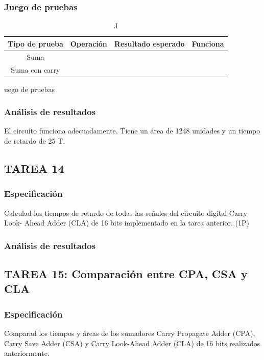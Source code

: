 \documentclass{article}
\begin{document}
		\subsubsection*{Juego de pruebas}
		\begin{table}[h]
			\begin{center}
				\begin{tabular}{| c | c | c | c |}
					\hline
					Tipo de prueba & Operación & Resultado esperado & Funciona \\ \hline
					
					Suma & & & \\ \hline
					Suma con carry & & & \\ \hline
				\end{tabular}
				\caption Juego de pruebas
			\end{center}
		\end{table}



		\subsubsection*{Análisis de resultados}
				El circuito funciona adecuadamente. Tiene un área de 1248 unidades y un tiempo de retardo de 25 T.


	\subsection{TAREA 14}
		\subsubsection*{Especificación}
		Calculad los tiempos de retardo de todas las señales del circuito digital Carry Look-
		Ahead Adder (CLA) de 16 bits implementado en la tarea anterior. (1P)

		\subsubsection*{Análisis de resultados}

	\subsection{TAREA 15: Comparación entre CPA, CSA y CLA}
		\subsubsection*{Especificación}
		Comparad los tiempos y áreas de los sumadores Carry Propagate Adder (CPA), Carry Save Adder (CSA) y Carry Look-Ahead Adder (CLA) de 16 bits realizados anteriormente.
\end{document}
